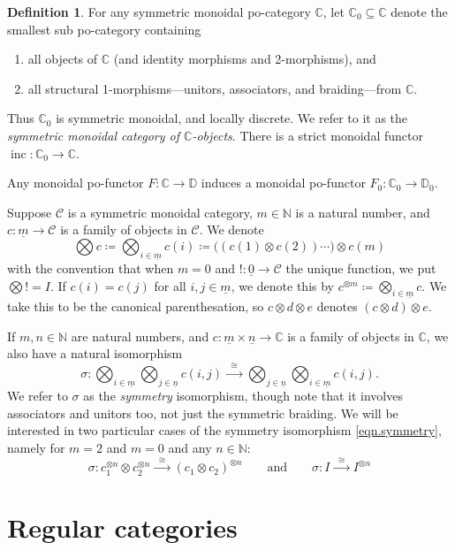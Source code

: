 \documentclass[11pt, oneside, article]{memoir}
\theoremstyle{plain}
\theoremstyle{definition}
\newtheorem{definition}[theorem]{Definition}
\theoremstyle{remark}
\newcommand{\ord}[1]{\underline{#1}}%
\newcommand{\cat}[1]{\mathcal{#1}}%
\DeclareMathOperator{\inc}{inc}
\newcommand{\tpow}[1]{^{\otimes #1}}
\newcommand{\cc}{\mathbb{C}}
\newcommand{\dd}{\mathbb{D}}
\newcommand{\nn}{\mathbb{N}}
\newcommand{\mob}[1]{#1_0}
\newcommand{\To}[1]{\xrightarrow{#1}}
\newcommand{\Too}[1]{\To{\;\;#1\;\;}}
\renewcommand{\ss}{\subseteq}
\newcommand{\qqand}{\qquad\text{and}\qquad}
\begin{document}
\begin{definition}\label{def.mob}
For any symmetric monoidal po-category $\cc$, let $\mob{\cc}\ss\cc$ denote the smallest sub po-category containing
\begin{enumerate}
	\item all objects of $\cc$ (and identity morphisms and 2-morphisms), and
	\item all structural 1-morphisms---unitors, associators, and braiding---from $\cc$.
\end{enumerate}
Thus $\mob{\cc}$ is symmetric monoidal, and locally discrete. We refer to it as the \emph{symmetric monoidal category of $\cc$-objects}. There is a strict monoidal functor $\inc\colon\mob{\cc}\to\cc$. 

Any monoidal po-functor $F\colon\cc\to\dd$ induces a monoidal po-functor $\mob{F}\colon\mob{\cc}\to\mob{\dd}$.
\end{definition}

Suppose $\cat{C}$ is a symmetric monoidal category, $m\in\nn$ is a natural number, and $c\colon\ord{m}\to\cat{C}$ is a family of objects in $\cat{C}$. We denote
\[
  \bigotimes c\coloneqq\bigotimes_{i\in\ord{m}}c(i)\coloneqq
  \big((c(1)\otimes c(2))\cdots\big)\otimes c(m)
\]
with the convention that when $m=0$ and $!\colon\ord{0}\to \cat{C}$ the unique function, we put $\bigotimes != I$. If $c(i)=c(j)$ for all $i,j\in\ord{m}$, we denote this by $c\tpow{m}\coloneqq\bigotimes_{i\in\ord{m}}c$. We take this to be the canonical parenthesation, so $c\otimes d\otimes e$ denotes $(c\otimes d)\otimes e$.

If $m,n\in\nn$ are natural numbers, and $c\colon \ord{m}\times \ord{n}\to\cc$ is a family of objects in $\cc$, we also have a natural isomorphism
\begin{equation}\label{eqn.symmetry}
\sigma\colon
\bigotimes_{i\in\ord{m}}\bigotimes_{j\in\ord{n}}c(i,j)\Too{\cong}
\bigotimes_{j\in\ord{n}}\bigotimes_{i\in\ord{m}}c(i,j).
\end{equation}
We refer to $\sigma$ as the \emph{symmetry} isomorphism, though note that it involves associators and unitors too, not just the symmetric braiding. We will be interested in two particular cases of the symmetry isomorphism \cref{eqn.symmetry}, namely for $m=2$ and $m=0$ and any $n\in\nn$:
\[\sigma\colon c_1\tpow{n}\otimes c_2\tpow{n}\Too{\cong}(c_1\otimes c_2)\tpow{n}
\qqand
\sigma\colon I\Too{\cong} I\tpow{n}
\]

\section{Regular categories}
\end{document}
